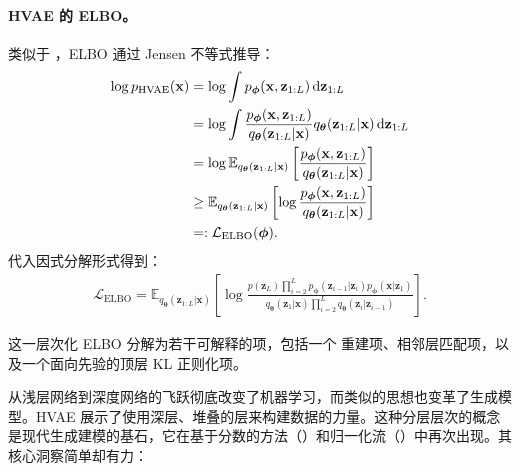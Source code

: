 \paragraph{HVAE 的 ELBO。}
类似于 ，ELBO 通过 Jensen 不等式推导：
\begin{align}\label{eq:hvae-elbo}
\begin{aligned}
    \log p_{\text{HVAE}}(\mathbf{x}) 
&= \log \int p_{\bm{\phi}}(\mathbf{x}, \mathbf{z}_{1:L}) \mathop{}\!\mathrm{d} \mathbf{z}_{1:L} \\
&= \log \int \frac{p_{\bm{\phi}}(\mathbf{x}, \mathbf{z}_{1:L})}{q_{\bm{\theta}}(\mathbf{z}_{1:L}|\mathbf{x})}   q_{\bm{\theta}}(\mathbf{z}_{1:L}|\mathbf{x}) \mathop{}\!\mathrm{d} \mathbf{z}_{1:L} \\
&= \log \mathbb{E}_{q_{\bm{\theta}}(\mathbf{z}_{1:L}|\mathbf{x})} \left[ \frac{p_{\bm{\phi}}(\mathbf{x}, \mathbf{z}_{1:L})}{q_{\bm{\theta}}(\mathbf{z}_{1:L}|\mathbf{x})} \right] \\
&\geq \mathbb{E}_{q_{\bm{\theta}}(\mathbf{z}_{1:L}|\mathbf{x})} \left[ \log \frac{p_{\bm{\phi}}(\mathbf{x}, \mathbf{z}_{1:L})}{q_{\bm{\theta}}(\mathbf{z}_{1:L}|\mathbf{x})} \right]\\
&=:\mathcal{L}_{\text{ELBO}}(\bm{\phi}).
\end{aligned}
\end{align}
代入因式分解形式得到：
\begin{align*}
\mathcal{L}_{\text{ELBO}} 
= \mathbb{E}_{q_{\bm{\theta}}(\mathbf{z}_{1:L}|\mathbf{x})} \left[ 
\log \frac{
p(\mathbf{z}_L) \prod_{i=2}^{L} p_{\bm{\phi}}(\mathbf{z}_{i-1} | \mathbf{z}_i)   p_{\bm{\phi}}(\mathbf{x} | \mathbf{z}_1)
}{
q_{\bm{\theta}}(\mathbf{z}_1|\mathbf{x}) \prod_{i=2}^{L} q_{\bm{\theta}}(\mathbf{z}_i|\mathbf{z}_{i-1})
}
\right].
\end{align*}

这一层次化 ELBO 分解为若干可解释的项，包括一个
重建项、相邻层匹配项，以及一个面向先验的顶层 KL
正则化项。

从浅层网络到深度网络的飞跃彻底改变了机器学习，而类似的思想也变革了生成模型。HVAE 展示了使用深层、堆叠的层来构建数据的力量。这种分层层次的概念是现代生成建模的基石，它在基于分数的方法（）和归一化流（）中再次出现。其核心洞察简单却有力：





